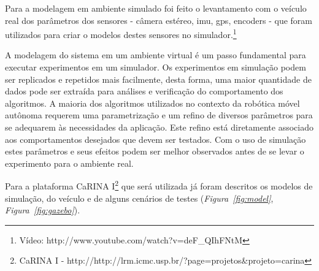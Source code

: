 \documentclass{article}
\newcommand{\foot}[1]{\footnote{	\fontfamily{cmss}\selectfont\footnotesize{#1}}}
\newcommand{\fig}[1]{\textit{Figura~\ref{#1}}}
\begin{document}
Para a modelagem em ambiente simulado foi feito o levantamento com o veículo
real dos parâmetros dos sensores - câmera estéreo, imu, gps, encoders - que
foram utilizados para criar o modelos destes sensores no simulador.\foot{Vídeo:
http://www.youtube.com/watch?v=deF\_QIhFNtM}


A modelagem do sistema em um ambiente virtual é um passo fundamental para
executar experimentos em um simulador. Os experimentos em simulação podem ser
replicados e repetidos mais facilmente, desta forma, uma maior quantidade de
dados pode ser extraída para análises e verificação do comportamento dos
algoritmos. A maioria dos algoritmos utilizados no contexto da robótica móvel
autônoma requerem uma parametrização e um refino de diversos parâmetros para se
adequarem às necessidades da aplicação. Este refino está diretamente associado
aos comportamentos desejados que devem ser testados. Com o uso de simulação
estes parâmetros e seus efeitos podem ser melhor observados antes de se levar o
experimento para o ambiente real.

Para a plataforma CaRINA I\foot{CaRINA I -
http://http://lrm.icmc.usp.br/?page=projetos&projeto=carina} que será utilizada
já foram descritos os modelos de simulação, do veículo e de alguns cenários de
testes (\fig{fig:model}, \fig{fig:gazebo}).
\end{document}
